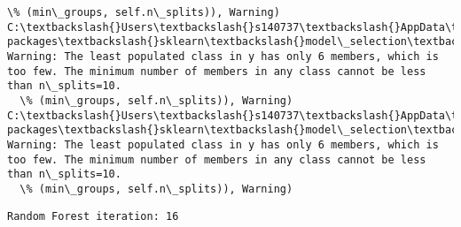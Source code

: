 \documentclass[11pt]{article}
\begin{document}
\begin{Verbatim}[commandchars=\\\{\}]
  \% (min\_groups, self.n\_splits)), Warning)
C:\textbackslash{}Users\textbackslash{}s140737\textbackslash{}AppData\textbackslash{}Local\textbackslash{}Continuum\textbackslash{}anaconda3\textbackslash{}lib\textbackslash{}site-packages\textbackslash{}sklearn\textbackslash{}model\_selection\textbackslash{}\_split.py:605: Warning: The least populated class in y has only 6 members, which is too few. The minimum number of members in any class cannot be less than n\_splits=10.
  \% (min\_groups, self.n\_splits)), Warning)
C:\textbackslash{}Users\textbackslash{}s140737\textbackslash{}AppData\textbackslash{}Local\textbackslash{}Continuum\textbackslash{}anaconda3\textbackslash{}lib\textbackslash{}site-packages\textbackslash{}sklearn\textbackslash{}model\_selection\textbackslash{}\_split.py:605: Warning: The least populated class in y has only 6 members, which is too few. The minimum number of members in any class cannot be less than n\_splits=10.
  \% (min\_groups, self.n\_splits)), Warning)

    \end{Verbatim}

    \begin{Verbatim}[commandchars=\\\{\}]
Random Forest iteration: 16 

    \end{Verbatim}
\end{document}
